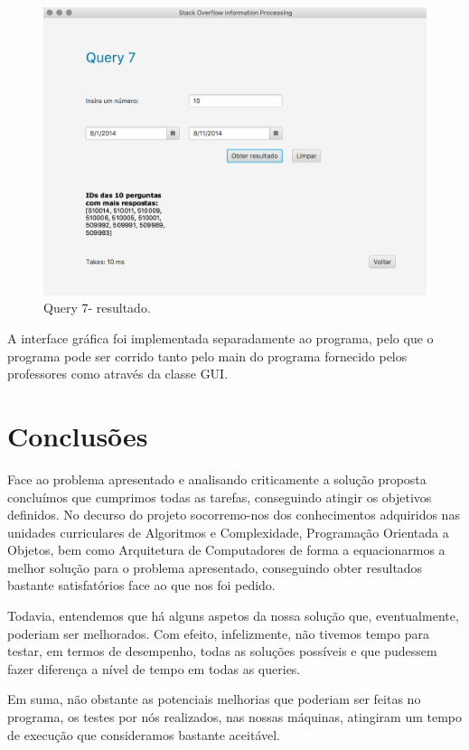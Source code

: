 \documentclass[a4paper]{article}
\begin{document}
\begin{figure}[H]
\centering
\includegraphics[scale=0.40]{imgs/query7result.png}
\caption{Query 7- resultado.}
\label{img:query7rest}
\end{figure}


A interface gráfica foi implementada separadamente ao programa, pelo que
o programa pode ser corrido tanto pelo main do programa fornecido pelos
professores como através da classe GUI.


\section{Conclusões}
\label{sec:conclusao}

Face ao problema apresentado e analisando criticamente a solução proposta concluímos
que cumprimos todas as tarefas, conseguindo atingir os objetivos definidos. No decurso
do projeto socorremo-nos dos conhecimentos adquiridos nas unidades curriculares de
Algoritmos e Complexidade, Programação Orientada a Objetos, bem como Arquitetura de Computadores
de forma a equacionarmos a melhor solução para o problema apresentado, conseguindo
obter resultados bastante satisfatórios face ao que nos foi pedido. \par
Todavia, entendemos que há alguns aspetos da nossa solução que, eventualmente,
poderiam ser melhorados. Com efeito, infelizmente, não tivemos tempo para testar,
em termos de desempenho, todas as soluções possíveis e que pudessem fazer diferença
a nível de tempo em todas as queries.\par
Em suma, não obstante as potenciais melhorias que poderiam ser feitas no
programa, os testes por nós realizados, nas nossas máquinas, atingiram
um tempo de execução que consideramos bastante aceitável.
\end{document}
